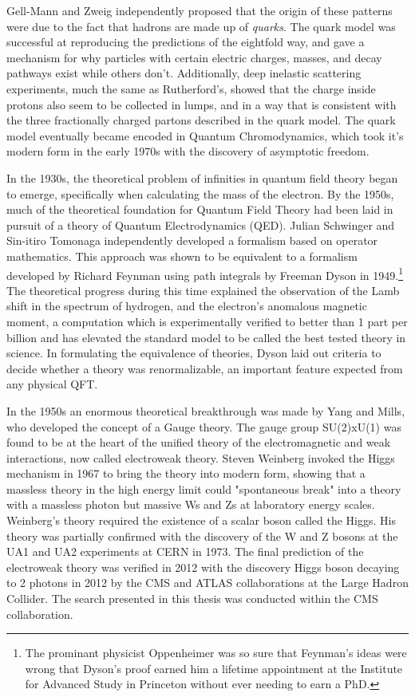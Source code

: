     Gell-Mann and Zweig independently proposed that the origin of these patterns were due to the fact that hadrons are made up of \emph{quarks}. The quark model was successful at reproducing the predictions of the eightfold way, and gave a mechanism for why particles with certain electric charges, masses, and decay pathways exist while others don't. Additionally, deep inelastic scattering experiments, much the same as Rutherford's, showed that the charge inside protons also seem to be collected in lumps, and in a way that is consistent with the three fractionally charged partons described in the quark model. \cite{proton_structure} The quark model eventually became encoded in Quantum Chromodynamics, which took it's modern form in the early 1970s with the discovery of asymptotic freedom.

    In the 1930s, the theoretical problem of infinities in quantum field theory began to emerge, specifically when calculating the mass of the electron. By the 1950s, much of the theoretical foundation for Quantum Field Theory had been laid in pursuit of a theory of Quantum Electrodynamics (QED). Julian Schwinger and Sin-itiro Tomonaga independently developed a formalism based on operator mathematics. This approach was shown to be equivalent to a formalism developed by Richard Feynman using path integrals by Freeman Dyson in 1949.\footnote{The prominant physicist Oppenheimer was so sure that Feynman's ideas were wrong that Dyson's proof earned him a lifetime appointment at the Institute for Advanced Study in Princeton without ever needing to earn a PhD.} The theoretical progress during this time explained the observation of the Lamb shift in the spectrum of hydrogen, and the electron's anomalous magnetic moment, a computation which is experimentally verified to better than 1 part per billion and has elevated the standard model to be called the best tested theory in science. In formulating the equivalence of theories, Dyson laid out criteria to decide whether a theory was renormalizable, an important feature expected from any physical QFT.

    In the 1950s an enormous theoretical breakthrough was made by Yang and Mills, who developed the concept of a Gauge theory. The gauge group SU(2)xU(1) was found to be at the heart of the unified theory of the electromagnetic and weak interactions, now called electroweak theory. Steven Weinberg invoked the Higgs mechanism in 1967 to bring the theory into modern form, showing that a massless theory in the high energy limit could "spontaneous break" into a theory with a massless photon but massive Ws and Zs at laboratory energy scales. Weinberg's theory required the existence of a scalar boson called the Higgs. \cite{Weinberg_EWK} His theory was partially confirmed with the discovery of the W and Z bosons at the UA1 and UA2 experiments at CERN in 1973. The final prediction of the electroweak theory was verified in 2012 with the discovery Higgs boson decaying to 2 photons in 2012 by the CMS and ATLAS collaborations at the Large Hadron Collider. \cite{CMS_higgs,ATLAS_higgs} The search presented in this thesis was conducted within the CMS collaboration.

